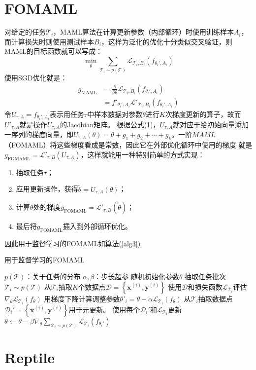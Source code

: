 \documentclass[11pt,twoside,a4paper]{ctexart}
\begin{document}
	\section{FOMAML}
	对给定的任务$\mathcal T_i$，MAML算法在计算更新参数（内部循环）时使用训练样本$A_i$，而计算损失时则使用测试样本$B_i$，这样为泛化的优化十分类似交叉验证，则MAML的目标函数就可以写成：
	\begin{equation}
		\min_\theta\sum_{\mathcal T_i \sim p(\mathcal T)}\mathcal L_{\mathcal T_i,B_i}\left(f_{\theta_i',A_i}\right)
	\end{equation}
	使用SGD优化就是：
	\begin{align}
	g_{\text{MAML}} &= \frac{\partial}{\partial\theta}\mathcal L_{\mathcal T_i,B_i}\left(f_{\theta_i',A_i}\right)\\
	&= f'_{\theta_i',A_i}\mathcal L'_{\mathcal T_i,B_i}\left(f_{\theta_i',A_i}\right)
	\end{align}
	令$U_{\tau,A}=f_{\theta_i',A_i}$表示用任务$\tau$中样本数据对参数$\theta$进行$K$次梯度更新的算子，故而$U'_{\tau,A}$就是操作$U_{\tau,A}$的Jacobian矩阵。
	根据公式(1)，$U_{\tau,A}$就对应于给初始向量添加一序列的梯度向量，即$U_{\tau,A}(\theta)=\theta+g_1+g_2+\cdots+g_k$。一阶$MAML$（FOMAML）将这些梯度看成是常数，因此它在外部优化循环中使用的梯度
	就是$g_{\text{FOMAML}}=\mathcal L'_{\tau,B}\left(U_{\tau,A}\right)$，这样就能用一种特别简单的方式实现：
	\begin{enumerate}
		\item 抽取任务$\tau$；
		\item 应用更新操作，获得$\tilde{\theta}=U_{\tau,A}(\theta)$；
		\item 计算$\tilde{\theta}$处的梯度$g_{\text{FOMAML}}=\mathcal L'_{\tau,B}\left(\tilde{\theta}\right)$；
		\item 最后将$g_{\text{FOMAML}}$插入到外部循环优化。
	\end{enumerate}
	因此用于监督学习的FOMAML如\hyperref[alg3]{算法(\ref{alg3})}
	\begin{algorithm}
		\caption{用于监督学习的FOMAML}
		\label{alg3}
		\begin{algorithmic}[1]
			\Require $p(\mathcal T)$：关于任务的分布
			\Require $\alpha,\beta$：步长超参
			\State 随机初始化参数$\theta$
			\State 抽取任务批次$\mathcal T_i \sim p(\mathcal T)$
			\State 从$\mathcal{T}_i$抽取$K$个数据点$\mathcal D=\left\{\mathbf{x}^{(i)},\mathbf{y}^{(i)}\right\}$
			\State 使用$\mathcal D$和损失函数$\mathcal{L}_{\mathcal{T}_i}$评估$\nabla_\theta\mathcal L_{\mathcal T_i}\left( f_\theta \right)$
			\State 用梯度下降计算调整参数$\theta'_i=\theta-\alpha\mathcal{L}_{\mathcal{T}_i}\left( f_\theta \right)$
			\State 从$\mathcal{T}_i$抽取数据点$\mathcal D_i'=\left\{\mathbf{x}^{(i)},\mathbf{y}^{(i)}\right\}$用于元更新。
			\EndFor
			\State 使用每个$\mathcal D_i'$和$\mathcal{L}_{\mathcal{T}_i}$更新$\theta \gets \theta - \beta\nabla_\theta\sum_{\mathcal{T}_i\sim p(\mathcal{T})}\mathcal{L}_{\mathcal{T}_i}\left( f_{\theta_i'}\right)$
			\EndWhile
		\end{algorithmic}
	\end{algorithm}
	
	\clearpage
	\section{Reptile}
	
\end{document}

